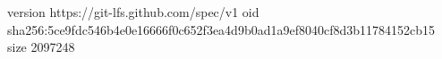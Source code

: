 version https://git-lfs.github.com/spec/v1
oid sha256:5ce9fdc546b4e0e16666f0c652f3ea4d9b0ad1a9ef8040cf8d3b11784152cb15
size 2097248
